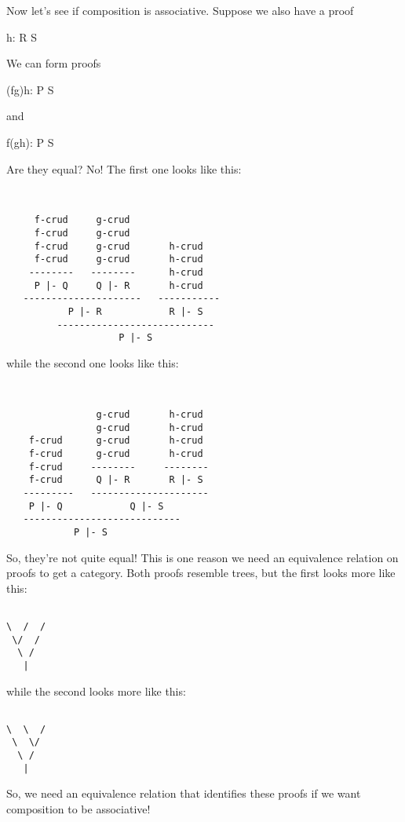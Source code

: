 Now let's see if composition is associative.  Suppose we also have a 
proof

h: R \to  S

We can form proofs

(fg)h: P \to  S

and

f(gh): P \to  S 

Are they equal?  No!  The first one looks like this:



\begin{verbatim}


     f-crud     g-crud
     f-crud     g-crud
     f-crud     g-crud       h-crud
     f-crud     g-crud       h-crud
    --------   --------      h-crud
     P |- Q     Q |- R       h-crud
   ---------------------   ----------- 
           P |- R            R |- S 
         ----------------------------
                    P |- S

\end{verbatim}
    
while the second one looks like this:



\begin{verbatim}


                g-crud       h-crud
                g-crud       h-crud
    f-crud      g-crud       h-crud
    f-crud      g-crud       h-crud
    f-crud     --------     --------      
    f-crud      Q |- R       R |- S      
   ---------   --------------------- 
    P |- Q            Q |- S 
   ----------------------------
            P |- S

\end{verbatim}
    
So, they're not quite equal!  This is one reason we need an 
equivalence relation on proofs to get a category.  Both proofs 
resemble trees, but the first looks more like this:


\begin{verbatim}

\  /  /
 \/  /
  \ /
   |
\end{verbatim}
    
while the second looks more like this:


\begin{verbatim}

\  \  /
 \  \/
  \ /
   |
\end{verbatim}
    
So, we need an equivalence relation that identifies these proofs
if we want composition to be associative! 

